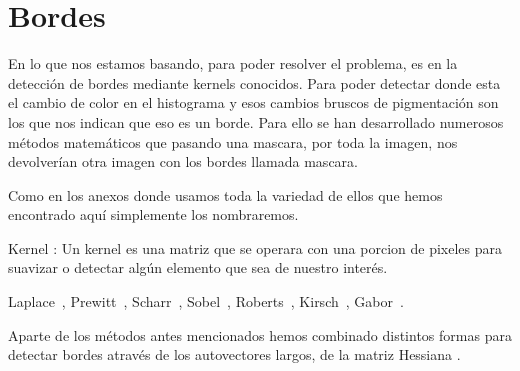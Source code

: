 \section{Bordes}
En lo que nos estamos basando, para poder resolver el problema,
es en la detección de bordes mediante kernels conocidos.
Para poder detectar donde esta el cambio de color en el histograma y esos cambios bruscos de pigmentación son los que nos indican que eso es un borde.
Para ello se han desarrollado numerosos métodos matemáticos que pasando una mascara, por toda la imagen, nos devolverían otra imagen con los bordes llamada mascara.

Como en los anexos donde usamos toda la variedad de ellos que hemos encontrado aquí simplemente los nombraremos.

Kernel \cite{wiki:kernels}: Un kernel es una matriz que se operara con una porcion de pixeles para suavizar o detectar algún elemento que sea de nuestro interés.

Laplace~\cite{wiki:Laplace}, Prewitt~\cite{wiki:Prewitt}, Scharr~\cite{jon:Scharr}, Sobel~\cite{wiki:Sobel}, Roberts~\cite{wiki:Roberts}, Kirsch~\cite{wiki:Kirsch}, Gabor~\cite{wiki:Gabor}.
 
Aparte de los métodos antes mencionados hemos combinado distintos formas para detectar bordes através de los autovectores \cite{wiki:Eigenvector} largos, de la matriz Hessiana \cite{wiki:Hessiana}.